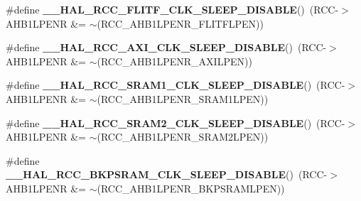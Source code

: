 \begin{DoxyCompactItemize}
\item 
\mbox{\label{group___r_c_c_ex___peripheral___clock___sleep___enable___disable_ga3d776af7d892a32ea3c68edf7891e4f5}} 
\#define {\bfseries \+\_\+\+\_\+\+H\+A\+L\+\_\+\+R\+C\+C\+\_\+\+F\+L\+I\+T\+F\+\_\+\+C\+L\+K\+\_\+\+S\+L\+E\+E\+P\+\_\+\+D\+I\+S\+A\+B\+LE}()~(R\+CC-\/$>$A\+H\+B1\+L\+P\+E\+NR \&= $\sim$(R\+C\+C\+\_\+\+A\+H\+B1\+L\+P\+E\+N\+R\+\_\+\+F\+L\+I\+T\+F\+L\+P\+EN))
\item 
\mbox{\label{group___r_c_c_ex___peripheral___clock___sleep___enable___disable_ga1f10eb651d6a25c8b9182aca04b86eeb}} 
\#define {\bfseries \+\_\+\+\_\+\+H\+A\+L\+\_\+\+R\+C\+C\+\_\+\+A\+X\+I\+\_\+\+C\+L\+K\+\_\+\+S\+L\+E\+E\+P\+\_\+\+D\+I\+S\+A\+B\+LE}()~(R\+CC-\/$>$A\+H\+B1\+L\+P\+E\+NR \&= $\sim$(R\+C\+C\+\_\+\+A\+H\+B1\+L\+P\+E\+N\+R\+\_\+\+A\+X\+I\+L\+P\+EN))
\item 
\mbox{\label{group___r_c_c_ex___peripheral___clock___sleep___enable___disable_ga725f14ee455c726c2a99be4714180dac}} 
\#define {\bfseries \+\_\+\+\_\+\+H\+A\+L\+\_\+\+R\+C\+C\+\_\+\+S\+R\+A\+M1\+\_\+\+C\+L\+K\+\_\+\+S\+L\+E\+E\+P\+\_\+\+D\+I\+S\+A\+B\+LE}()~(R\+CC-\/$>$A\+H\+B1\+L\+P\+E\+NR \&= $\sim$(R\+C\+C\+\_\+\+A\+H\+B1\+L\+P\+E\+N\+R\+\_\+\+S\+R\+A\+M1\+L\+P\+EN))
\item 
\mbox{\label{group___r_c_c_ex___peripheral___clock___sleep___enable___disable_ga6313cca024215b6681c273ea588e2ecf}} 
\#define {\bfseries \+\_\+\+\_\+\+H\+A\+L\+\_\+\+R\+C\+C\+\_\+\+S\+R\+A\+M2\+\_\+\+C\+L\+K\+\_\+\+S\+L\+E\+E\+P\+\_\+\+D\+I\+S\+A\+B\+LE}()~(R\+CC-\/$>$A\+H\+B1\+L\+P\+E\+NR \&= $\sim$(R\+C\+C\+\_\+\+A\+H\+B1\+L\+P\+E\+N\+R\+\_\+\+S\+R\+A\+M2\+L\+P\+EN))
\item 
\mbox{\label{group___r_c_c_ex___peripheral___clock___sleep___enable___disable_ga4138d3bc751d640d5841655554acb574}} 
\#define {\bfseries \+\_\+\+\_\+\+H\+A\+L\+\_\+\+R\+C\+C\+\_\+\+B\+K\+P\+S\+R\+A\+M\+\_\+\+C\+L\+K\+\_\+\+S\+L\+E\+E\+P\+\_\+\+D\+I\+S\+A\+B\+LE}()~(R\+CC-\/$>$A\+H\+B1\+L\+P\+E\+NR \&= $\sim$(R\+C\+C\+\_\+\+A\+H\+B1\+L\+P\+E\+N\+R\+\_\+\+B\+K\+P\+S\+R\+A\+M\+L\+P\+EN))

\end{DoxyCompactItemize}
